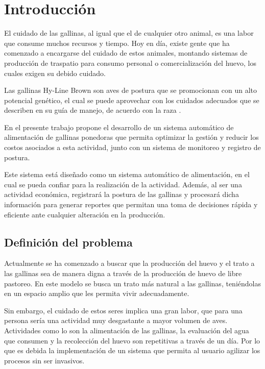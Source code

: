 
\chapter{Introducción}

El cuidado de las gallinas, al igual que el de cualquier otro animal, es una labor que consume muchos recursos y tiempo. Hoy en día, existe gente que ha comenzado a encargarse del cuidado de estos animales, montando sistemas de producción de traspatio para consumo personal o comercialización del huevo, los cuales exigen su debido cuidado.

Las gallinas Hy-Line Brown son aves de postura que se promocionan con un alto potencial genético, el cual se puede aprovechar con los cuidados adecuados que se describen en su guía de manejo, de acuerdo con la raza\cite{Hy-Line} .

En el presente trabajo propone el desarrollo de un sistema automático de alimentación de gallinas ponedoras que permita optimizar la gestión y reducir los costos asociados a esta actividad, junto con un sistema de monitoreo y registro de postura.

Este sistema está diseñado como un sistema automático de alimentación, en el cual se pueda confiar para la realización de la actividad. Además, al ser una actividad económica, registrará la postura de las gallinas y procesará dicha información para generar reportes que permitan una toma de decisiones rápida y eficiente ante cualquier alteración en la producción.

\newpage
\section{Definición del problema}

Actualmente se ha comenzado a buscar que la producción del huevo y el trato a las gallinas sea de manera digna a través de la producción de huevo de libre pastoreo. En este modelo se busca un trato más natural a las gallinas, teniéndolas en un espacio amplio que les permita vivir adecuadamente.

Sin embargo, el cuidado de estos seres implica una gran labor, que para una persona sería una actividad muy desgastante a mayor volumen de aves. Actividades como lo son la alimentación de las gallinas, la evaluación del agua que consumen y la recolección del huevo son repetitivas a través de un día. Por lo que es debida la implementación de un sistema que permita al usuario agilizar los procesos sin ser invasivos.

